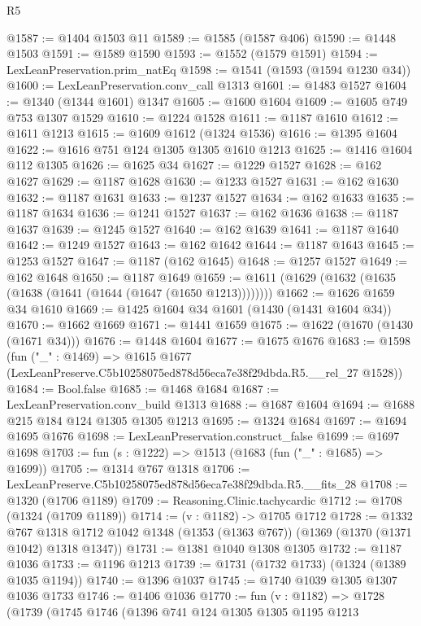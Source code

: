 \begin{lexlean}{R5}
\begin{coremodule}
@1587 := @1404 @1503 @11
@1589 := @1585 (@1587 @406)
@1590 := @1448 @1503
@1591 := @1589 @1590
@1593 := @1552 (@1579 @1591)
@1594 := LexLeanPreservation.prim_natEq
@1598 := @1541 (@1593 (@1594 @1230 @34))
@1600 := LexLeanPreservation.conv_call @1313
@1601 := @1483 @1527
@1604 := @1340 (@1344 @1601) @1347
@1605 := @1600 @1604
@1609 := @1605 @749 @753 @1307 @1529
@1610 := @1224 @1528
@1611 := @1187 @1610
@1612 := @1611 @1213
@1615 := @1609 @1612 (@1324 @1536)
@1616 := @1395 @1604
@1622 := @1616 @751 @124 @1305 @1305 @1610 @1213
@1625 := @1416 @1604 @112 @1305
@1626 := @1625 @34
@1627 := @1229 @1527
@1628 := @162 @1627
@1629 := @1187 @1628
@1630 := @1233 @1527
@1631 := @162 @1630
@1632 := @1187 @1631
@1633 := @1237 @1527
@1634 := @162 @1633
@1635 := @1187 @1634
@1636 := @1241 @1527
@1637 := @162 @1636
@1638 := @1187 @1637
@1639 := @1245 @1527
@1640 := @162 @1639
@1641 := @1187 @1640
@1642 := @1249 @1527
@1643 := @162 @1642
@1644 := @1187 @1643
@1645 := @1253 @1527
@1647 := @1187 (@162 @1645)
@1648 := @1257 @1527
@1649 := @162 @1648
@1650 := @1187 @1649
@1659 := @1611 (@1629 (@1632 (@1635 (@1638 (@1641 (@1644 (@1647 (@1650 @1213))))))))
@1662 := @1626 @1659 @34 @1610
@1669 := @1425 @1604 @34 @1601 (@1430 (@1431 @1604 @34))
@1670 := @1662 @1669
@1671 := @1441 @1659
@1675 := @1622 (@1670 (@1430 (@1671 @34)))
@1676 := @1448 @1604
@1677 := @1675 @1676
@1683 := @1598
    (fun ("_" : @1469) =>
    @1615 @1677 (LexLeanPreserve.C5b10258075ed878d56eca7e38f29dbda.R5.__rel_27 @1528))
@1684 := Bool.false
@1685 := @1468 @1684
@1687 := LexLeanPreservation.conv_build @1313
@1688 := @1687 @1604
@1694 := @1688 @215 @184 @124 @1305 @1305 @1213
@1695 := @1324 @1684
@1697 := @1694 @1695 @1676
@1698 := LexLeanPreservation.construct_false
@1699 := @1697 @1698
@1703 := fun (s : @1222) => @1513 (@1683 (fun ("_" : @1685) => @1699))
@1705 := @1314 @767 @1318
@1706 := LexLeanPreserve.C5b10258075ed878d56eca7e38f29dbda.R5.__fits_28
@1708 := @1320 (@1706 @1189)
@1709 := Reasoning.Clinic.tachycardic
@1712 := @1708 (@1324 (@1709 @1189))
@1714 := (v : @1182) -> @1705 @1712
@1728 := @1332
    @767
    @1318
    @1712
    @1042
    @1348
    (@1353 (@1363 @767))
    (@1369 (@1370 (@1371 @1042) @1318 @1347))
@1731 := @1381 @1040 @1308 @1305
@1732 := @1187 @1036
@1733 := @1196 @1213
@1739 := @1731 (@1732 @1733) (@1324 (@1389 @1035 @1194))
@1740 := @1396 @1037
@1745 := @1740 @1039 @1305 @1307 @1036 @1733
@1746 := @1406 @1036
@1770 := fun (v : @1182) =>
  @1728
    (@1739
      (@1745
        @1746
        (@1396
          @741
          @124
          @1305
          @1305
          @1195
          @1213

\end{coremodule}
\end{lexlean}
